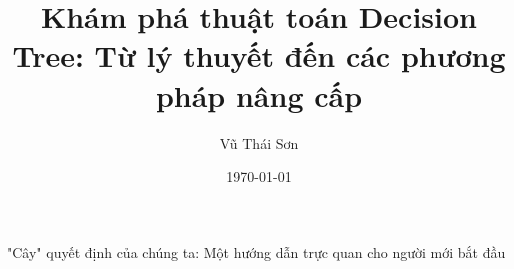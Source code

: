 \documentclass[12pt]{article}
\begin{document}
\title{Khám phá thuật toán Decision Tree: Từ lý thuyết đến các phương pháp nâng cấp}

\author{Vũ Thái Sơn}

\date{\today}

\maketitle

\begin{center}
\large "Cây" quyết định của chúng ta: Một hướng dẫn trực quan cho người mới bắt đầu
\end{center}





\end{document}
